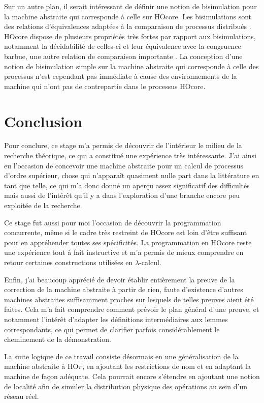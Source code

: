 \documentclass[11pt]{article}
\begin{document}
Sur un autre plan, il serait intéressant de définir une notion de bisimulation pour la machine abstraite qui corresponde à celle sur HOcore.
Les bisimulations sont des relations d'équivalences adaptées à la comparaison de processus distribués \cite{Pous08}.
HOcore dispose de plusieurs propriétés très fortes par rapport aux bisimulations, notamment la décidabilité de celles-ci et leur équivalence avec la congruence barbue, une autre relation de comparaison importante \cite{Escarra15}.
La conception d'une notion de bisimulation simple sur la machine abstraite qui corresponde à celle des processus n'est cependant pas immédiate à cause des environnements de la machine qui n'ont pas de contrepartie dans le processus HOcore.

\section{Conclusion}

Pour conclure, ce stage m'a permis de découvrir de l'intérieur le milieu de la recherche théorique, ce qui a constitué une expérience très intéressante.
J'ai ainsi eu l'occasion de concevoir une machine abstraite pour un calcul de processus d'ordre supérieur, chose qui n'apparaît quasiment nulle part dans la littérature en tant que telle, ce qui m'a donc donné un aperçu assez significatif des difficultés mais aussi de l'intérêt qu'il y a dans l'exploration d'une branche encore peu exploitée de la recherche.

Ce stage fut aussi pour moi l'occasion de découvrir la programmation concurrente, même si le cadre très restreint de HOcore est loin d'être suffisant pour en appréhender toutes ses spécificités.
La programmation en HOcore reste une expérience tout à fait instructive et m'a permis de mieux comprendre en retour certaines constructions utilisées en $\lambda$-calcul.

Enfin, j'ai beaucoup apprécié de devoir établir entièrement la preuve de la correction de la machine abstraite à partir de rien, faute d'existence d'autres machines abstraites suffisamment proches sur lesquels de telles preuves aient été faites.
Cela m'a fait comprendre comment prévoir le plan général d'une preuve, et notamment l'intérêt d'adapter les définitions intermédiaires aux lemmes correspondants, ce qui permet de clarifier parfois considérablement le cheminement de la démonstration.

La suite logique de ce travail consiste désormais en une généralisation de la machine abstraite à HO$\pi$, en ajoutant les restrictions de nom et en adaptant la machine de façon adéquate.
Cela pourrait encore s'étendre en ajoutant une notion de localité afin de simuler la distribution physique des opérations au sein d'un réseau réel.

\textit{\\}



\end{document}
